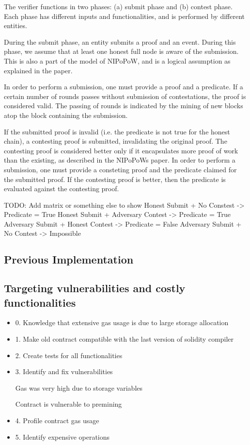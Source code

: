 \documentclass{article}
\begin{document}
  The verifier functions in two phases: (a) submit phase and (b) contest
  phase. Each phase has different inputs and functionalities, and is
  performed by different entities.

  During the submit phase, an entity submits a proof and an event.
  During this phase, we assume that at least one honest full node is
  aware of the submission. This is also a part of the model of NIPoPoW,
  and is a logical assumption as explained in the paper.

  In order to perform a submission, one must provide a proof and a
  predicate. If a certain number of rounds passes without submission of
  contestations, the proof is considered valid. The passing of rounds is
  indicated by the mining of new blocks atop the block containing the
  submission.

  If the submitted proof is invalid (i.e. the predicate is not true for
  the honest chain), a contesting proof is submitted, invalidating the
  original proof. The contesting proof is considered better only if it
  encapsulates more proof of work than the existing, as described in the
  NIPoPoWs paper. In order to perform a submission, one must provide a
  consteting proof and the predicate claimed for the submitted proof. If
  the contesting proof is better, then the predicate is evaluated
  against the contesting proof.

  TODO: Add matrix or something else to show Honest Submit + No Constest
  -> Predicate = True Honest Submit + Adversary Contest -> Predicate =
  True Adversary Submit + Honest Contest -> Predicate = False Adversary
  Submit + No Contest -> Impossible

  \subsection{Previous Implementation}

  \subsection{Targeting vulnerabilities and costly functionalities}

  \begin{itemize}
  \item
    0. Knowledge that extensive gas usage is due to large storage
    allocation
  \item
    1. Make old contract compatible with the last version of solidity
    compiler
  \item
    2. Create tests for all functionalities
  \item
    3. Identify and fix vulnerabilities

    Gas was very high due to storage variables

    Contract is vulnerable to premining
  \item
    4. Profile contract gas usage
  \item
    5. Identify expensive operations
  \end{itemize}
\end{document}
